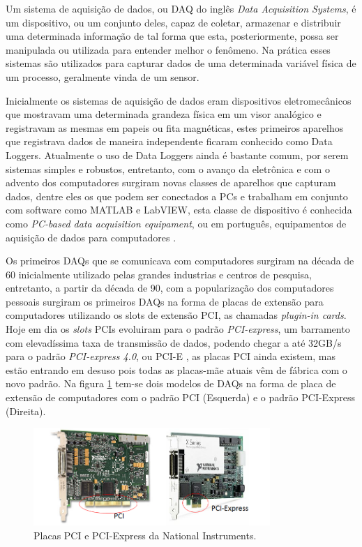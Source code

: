 Um sistema de aquisição de dados, ou DAQ do inglês \emph{Data Acquisition Systems}, é um dispositivo, ou um conjunto deles, capaz de coletar, armazenar e distribuir uma determinada informação de tal forma que esta, posteriormente, possa ser manipulada ou utilizada para entender melhor o fenômeno. Na prática esses sistemas são utilizados para capturar dados de uma determinada variável física de um processo, geralmente vinda de um sensor.

Inicialmente os sistemas de aquisição de dados eram dispositivos eletromecânicos que mostravam uma determinada grandeza física em um visor analógico e registravam as mesmas em papeis ou fita magnéticas, estes primeiros aparelhos que registrava dados de maneira independente ficaram conhecido como {Data Loggers}. Atualmente o uso de {Data Loggers} ainda é bastante comum, por serem sistemas simples e robustos, entretanto, com o avanço da eletrônica e com o advento dos computadores surgiram novas classes de aparelhos que capturam dados, dentre eles os que podem ser conectados a PCs e trabalham em conjunto com software como MATLAB e LabVIEW, esta classe de dispositivo é conhecida como \emph{PC-based data acquisition equipament}, ou em português, equipamentos de aquisição de dados para computadores \cite{daqbook}.

Os primeiros DAQs que se comunicava com computadores surgiram na década de 60 inicialmente utilizado pelas grandes industrias e centros de pesquisa, entretanto, a partir da década de 90, com a popularização dos computadores pessoais surgiram os primeiros DAQs na forma de placas de extensão para computadores utilizando os slots de extensão PCI, as chamadas \emph{plugin-in cards}. Hoje em dia os \emph{slots} PCIs evoluiram para o padrão \emph{PCI-express}, um barramento com elevadíssima taxa de transmissão de dados, podendo chegar a até 32GB/s para o padrão \emph{PCI-express 4.0}, ou PCI-E \cite{tecmundopcie}, as placas PCI ainda existem, mas estão entrando em desuso pois todas as placas-mãe atuais vêm de fábrica com o novo padrão. Na figura \ref{figura:pcixpcieni} tem-se dois modelos de DAQs na forma de placa de extensão de computadores com o padrão PCI (Esquerda) e o padrão PCI-Express (Direita).

\begin{figure}
	\centering
	\includegraphics[width=0.8\textwidth]{figuras/pcivspcienational.png}
	\caption{Placas PCI e PCI-Express da National Instruments. \cite{lojanational}}
	\label{figura:pcixpcieni}
\end{figure}

